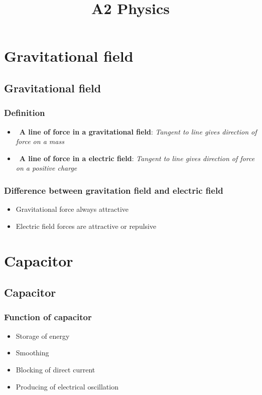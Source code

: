 \documentclass[a4paper,9pt]{scrartcl}
\title{A2 Physics}
\begin{document}
    \section{Gravitational field}

    \subsection{Gravitational field}

    \subsubsection{Definition}

    \begin{itemize}
        \item~\textbf{A line of force in a gravitational field}: \textit{Tangent to line gives direction of force on a mass}
        \item~\textbf{A line of force in a electric field}: \textit{Tangent to line gives direction of force on a positive charge}
    \end{itemize}

    \subsubsection{Difference between gravitation field and electric field}
    \begin{itemize}
        \item Gravitational force always attractive
        \item Electric field forces are attractive or repulsive
    \end{itemize}


    \section{Capacitor}

    \subsection{Capacitor}

    \subsubsection{Function of capacitor}
    \begin{itemize}
        \item Storage of energy
        \item Smoothing
        \item Blocking of direct current
        \item Producing of electrical oscillation
    \end{itemize}
\end{document}
